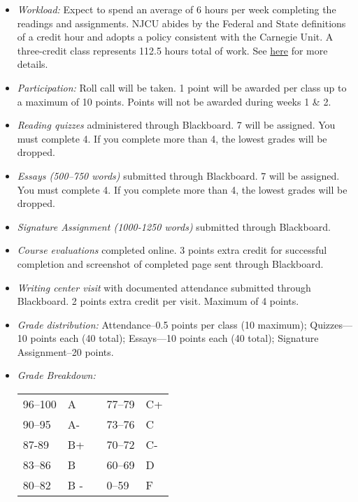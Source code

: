\documentclass[article,oneside]{memoir}
\begin{document}
\begin{itemize}
\item \textit{Workload:} Expect to spend an average of 6 hours per week completing the readings and assignments. NJCU abides by the Federal and State definitions of a credit hour and adopts a policy consistent with the Carnegie Unit. A three-credit class represents 112.5 hours total of work. See \href{http://scottoconnor.org/resources/Credit.pdf}{here} for more details.

\item \textit{Participation:} Roll call will be taken. 1 point will be awarded per class up to a maximum of 10 points. Points will not be awarded during weeks 1 \& 2. 

\item \textit{Reading quizzes} administered through Blackboard. 7 will be assigned. You must complete 4. If you complete more than 4, the lowest grades will be dropped. 


\item \textit{Essays (500--750 words)} submitted through Blackboard.  7 will be assigned. You must complete 4. If you complete more than 4, the lowest grades will be dropped. 

\item \textit{Signature Assignment (1000-1250 words)} submitted through Blackboard. 

\item \textit{Course evaluations} completed online. 3 points extra credit for successful completion  and screenshot of completed page sent through Blackboard. 

\item \textit{Writing center visit} with documented attendance submitted through Blackboard. 2 points extra credit per visit. Maximum of 4 points.  
  
\item \textit{Grade distribution:} Attendance--0.5 points per class (10 maximum); Quizzes---10 points each (40 total);  Essays---10 points each (40 total); Signature Assignment--20 points.


\item \textit{Grade Breakdown:}

 \begin{tabular}{ | l | l | p{2cm} | l | l | }
    \hline 
96--100 & A  & &  77--79 &  C+ \\  
90--95 & A- & &  73--76 & C \\
87-89 & B+ &  &  70--72 & C- \\ 
83--86 & B  & &  60--69 & D\\
80--82 & B - & & 0--59 & F\\ \hline
    \end{tabular}


\end{itemize}
\end{document}
